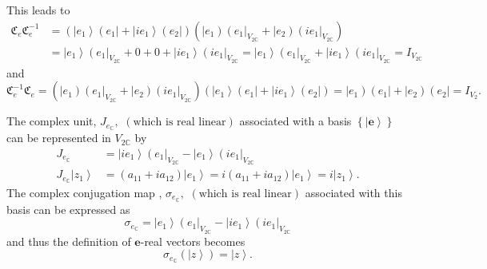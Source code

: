 \documentclass[aps,preprint]{revtex4}%
\begin{document}
This leads to
\begin{align}
\mathfrak{C}_{e}\mathfrak{C}_{e}^{-1}  &  =\left(  \left\vert e_{1}%
\right\rangle \left(  e_{1}\right\vert +\left\vert ie_{1}\right\rangle \left(
e_{2}\right\vert \right)  \left(  \left\vert e_{1}\right)  \left(
e_{1}\right\vert _{V_{2\mathbb{C}}}+\left\vert e_{2}\right)  \left(
ie_{1}\right\vert _{V_{2\mathbb{C}}}\right) \\
&  =\left\vert e_{1}\right\rangle \left(  e_{1}\right\vert _{V_{2\mathbb{C}}%
}+0+0+\left\vert ie_{1}\right\rangle \left(  ie_{1}\right\vert
_{V_{2\mathbb{C}}}=\left\vert e_{1}\right\rangle \left(  e_{1}\right\vert
_{V_{2\mathbb{C}}}+\left\vert ie_{1}\right\rangle \left(  ie_{1}\right\vert
_{V_{2\mathbb{C}}}=I_{V_{2\mathbb{C}}}%
\end{align}
and%
\begin{equation}
\mathfrak{C}_{e}^{-1}\mathfrak{C}_{e}=\left(  \left\vert e_{1}\right)  \left(
e_{1}\right\vert _{V_{2\mathbb{C}}}+\left\vert e_{2}\right)  \left(
ie_{1}\right\vert _{V_{2\mathbb{C}}}\right)  \left(  \left\vert e_{1}%
\right\rangle \left(  e_{1}\right\vert +\left\vert ie_{1}\right\rangle \left(
e_{2}\right\vert \right)  =\left\vert e_{1}\right)  \left(  e_{1}\right\vert
+\left\vert e_{2}\right)  \left(  e_{2}\right\vert =I_{V_{2}}.
\end{equation}


The complex unit, $J_{e_{\mathbb{C}}},$ $\left(  \text{which is real
linear}\right)  $ associated with a basis $\left\{  \left\vert \mathbf{e}%
\right\rangle \right\}  $ can be represented in $V_{2\mathbb{C}}$ by
\begin{align}
J_{e_{\mathbb{C}}}  &  =\left\vert ie_{1}\right\rangle \left(  e_{1}%
\right\vert _{V_{2\mathbb{C}}}-\left\vert e_{1}\right\rangle \left(
ie_{1}\right\vert _{V_{2\mathbb{C}}}\\
J_{e_{\mathbb{C}}}\left\vert z_{1}\right\rangle  &  =\left(  a_{11}%
+ia_{12}\right)  \left\vert e_{1}\right\rangle =i\left(  a_{11}+ia_{12}%
\right)  \left\vert e_{1}\right\rangle =i\left\vert z_{1}\right\rangle .
\end{align}
The complex conjugation map , $\sigma_{e_{\mathbb{C}}},$ $\left(  \text{which
is real linear}\right)  $ associated with this basis can be expressed as
\[
\sigma_{e_{\mathbb{C}}}=\left\vert e_{1}\right\rangle \left(  e_{1}\right\vert
_{V_{2\mathbb{C}}}-\left\vert ie_{1}\right\rangle \left(  ie_{1}\right\vert
_{V_{2\mathbb{C}}}%
\]
and thus the definition of $\mathbf{e}$-real vectors becomes
\begin{equation}
\sigma_{e_{\mathbb{C}}}\left(  \left\vert z\right\rangle \right)  =\left\vert
z\right\rangle .
\end{equation}
\end{document}
